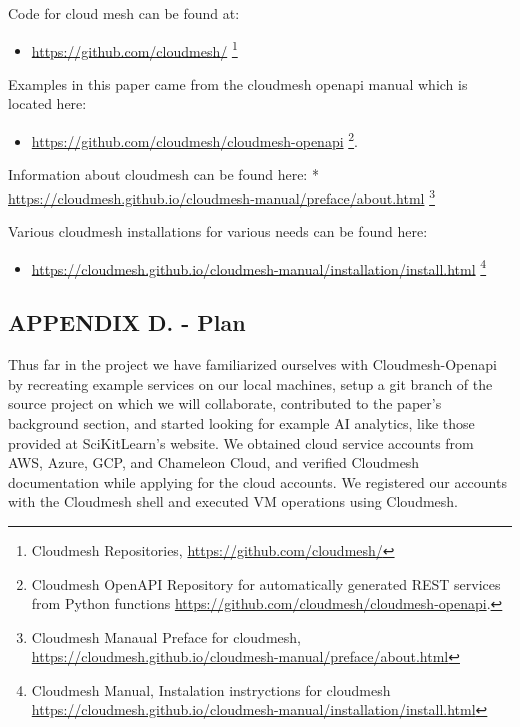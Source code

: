 Code for cloud mesh can be found at:

\begin{itemize}
\tightlist
\item
  \url{https://github.com/cloudmesh/} \footnote{Cloudmesh Repositories,
    \url{https://github.com/cloudmesh/}}
\end{itemize}

Examples in this paper came from the cloudmesh openapi manual which is
located here:

\begin{itemize}
\tightlist
\item
  \url{https://github.com/cloudmesh/cloudmesh-openapi} \footnote{Cloudmesh
    OpenAPI Repository for automatically generated REST services from
    Python functions
    \url{https://github.com/cloudmesh/cloudmesh-openapi}.}.
\end{itemize}

Information about cloudmesh can be found here: *
\url{https://cloudmesh.github.io/cloudmesh-manual/preface/about.html}
\footnote{Cloudmesh Manaual Preface for cloudmesh,
  \url{https://cloudmesh.github.io/cloudmesh-manual/preface/about.html}}

Various cloudmesh installations for various needs can be found here:

\begin{itemize}
\tightlist
\item
  \url{https://cloudmesh.github.io/cloudmesh-manual/installation/install.html}
  \footnote{Cloudmesh Manual, Instalation instryctions for cloudmesh
    \url{https://cloudmesh.github.io/cloudmesh-manual/installation/install.html}}
\end{itemize}

\subsection{APPENDIX D. - Plan}\label{appendix-d.---plan}

Thus far in the project we have familiarized ourselves with
Cloudmesh-Openapi by recreating example services on our local machines,
setup a git branch of the source project on which we will collaborate,
contributed to the paper's background section, and started looking for
example AI analytics, like those provided at SciKitLearn's website. We
obtained cloud service accounts from AWS, Azure, GCP, and Chameleon
Cloud, and verified Cloudmesh documentation while applying for the cloud
accounts. We registered our accounts with the Cloudmesh shell and
executed VM operations using Cloudmesh.


